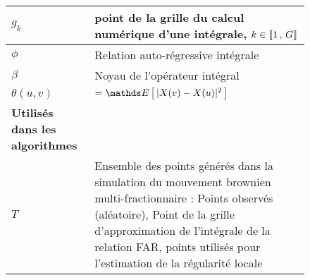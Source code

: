 \begin{figure}[H]
\begin{tabularx}{\textwidth}{lX}
		$g_k$             & point de la grille du calcul numérique d'une intégrale, $k \in \llbracket 1 \, , \, G \rrbracket$                                                                                                               \\
		\midrule
		$\phi$            & Relation auto-régressive intégrale                                                                                                                                                              \\
		$\beta$           & Noyau de l'opérateur intégral                                                                                                                                                                   \\
		\midrule
		$\theta(u,v)$     & $= \esperance{ |X(v) - X(u)|^2 }$                                                                                                                                                               \\
		\toprule
		\textbf{Utilisés dans les algorithmes}                                                                                                                                                                              \\
		\midrule
		$T$               & Ensemble des points générés dans la simulation du mouvement brownien multi-fractionnaire : Points observés (aléatoire), Point de la grille d'approximation de l'intégrale de la relation FAR, points utilisés pour l'estimation de la régularité locale                                                                                                        \\
		\bottomrule
	\end{tabularx}
\end{figure}